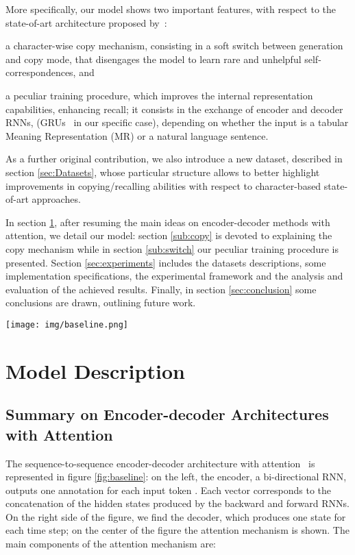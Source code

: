 \documentclass[runningheads, envcountsame, a4paper]{llncs}
\begin{document}
More specifically, our model shows two important features, with respect to the state-of-art architecture proposed by~\cite{Bahdanau:14}:
\begin{enumerate*}[label={(\roman*)}]
    \item a character-wise copy mechanism, consisting in a soft switch between generation and copy mode, that disengages the model to learn rare and unhelpful self-correspondences, and
    \item a peculiar training procedure, which improves the internal representation capabilities, enhancing recall; it consists in the exchange of encoder and decoder RNNs, (GRUs~\cite{Cho:14} in our specific case), depending on whether the input is a tabular Meaning Representation (MR) or a natural language sentence.
\end{enumerate*}

As a further original contribution, we also introduce a new dataset, described in section \ref{sec:Datasets}, whose particular structure allows to better highlight improvements in copying/recalling abilities with respect to character-based state-of-art approaches. 


In section \ref{sec:model}, after resuming the main ideas on encoder-decoder methods with attention, we detail our model: section \ref{sub:copy} is devoted to explaining the copy mechanism while in section \ref{sub:switch} our peculiar training procedure is presented. Section \ref{sec:experiments} includes the datasets descriptions, some implementation specifications, the experimental framework and the analysis and evaluation of the achieved results. Finally, in section \ref{sec:conclusion} some conclusions are drawn, outlining future work.

\begin{figure*}[t!]
    \centering
    \texttt{[image: img/baseline.png]}
    \caption{Encoder-decoder with attention model}
    \label{fig:baseline}
\end{figure*}

\section{Model Description}
\label{sec:model}
\subsection{Summary on Encoder-decoder Architectures with Attention }
\label{sub:bahdanau}

The sequence-to-sequence encoder-decoder architecture with attention~\cite{Bahdanau:14} is represented in figure \ref{fig:baseline}: on the left, the encoder, a bi-directional RNN, outputs one annotation  for each input token . Each vector  corresponds to the concatenation of the hidden states produced by the backward and forward RNNs. On the right side of the figure, we find the decoder, which produces one state  for each time step; on the center of the figure the attention mechanism is shown.
The main components of the attention mechanism are:
\end{document}
